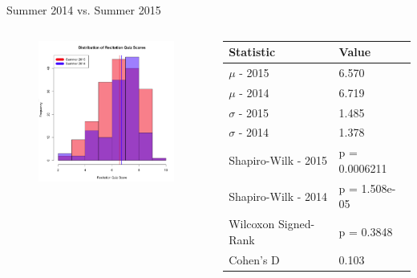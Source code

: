 \documentclass{beamer}
\begin{document}
\begin{frame}{Summer 2014 vs. Summer 2015}
\begin{columns}
\begin{column}{2in}
\begin{figure}
	\includegraphics[width=2in]{img/chapter4/rq_su15_vs_su14}
\end{figure}
\end{column}
\begin{column}{2in}
\begin{scriptsize}
\begin{table}
  \begin{tabular}{|l|l|}
    \hline
    \textbf{Statistic} & \textbf{Value} \\
	\hline
	$\mu$ - 2015 & 6.570 \\
	\hline
	$\mu$ - 2014 & 6.719 \\
	\hline
	$\sigma$ - 2015 & 1.485 \\
	\hline
	$\sigma$ - 2014 & 1.378 \\
	\hline
	Shapiro-Wilk - 2015 & p = 0.0006211 \\
	\hline
	Shapiro-Wilk - 2014 & p = 1.508e-05 \\
	\hline
	Wilcoxon Signed-Rank & p = 0.3848 \\
	\hline
	Cohen's D & 0.103 \\
	\hline
  \end{tabular}
\end{table}
\end{scriptsize}
\end{column}
\end{columns}
\end{frame}
\end{document}
